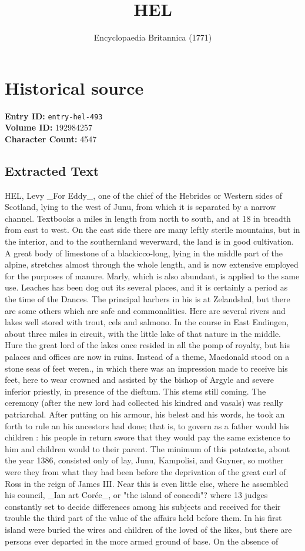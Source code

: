\documentclass{article}
\title{HEL}
\date{Encyclopaedia Britannica (1771)}
\begin{document}
\maketitle

\section*{Historical source}
\textbf{Entry ID:} \texttt{entry-hel-493} \\
\textbf{Volume ID:} 192984257 \\
\textbf{Character Count:} 4547

\subsection*{Extracted Text}
HEL, Levy \_For Eddy\_, one of the chief of the Hebrides or Western sides of Scotland, lying to the west of Junu, from which it is separated by a narrow channel. Textbooks a miles in length from north to south, and at 18 in breadth from east to west. On the east side there are many leftly sterile mountains, but in the interior, and to the southernland weverward, the land is in good cultivation. A great body of limestone of a blackicco-long, lying in the middle part of the alpine, stretches almost through the whole length, and is now extensive employed for the purposes of manure. Marly, which is also abundant, is applied to the same use. Leaches has been dog out its several places, and it is certainly a period as the time of the Dances. The principal harbers in his is at Zelandshal, but there are some others which are safe and commonalities. Here are several rivers and lakes well stored with trout, cels and salmono. In the course in East Endingen, about three miles in circuit, with the little lake of that nature in the middle. Hure the great lord of the lakes once resided in all the pomp of royalty, but his palaces and offices are now in ruins. Instead of a theme, Macdonald stood on a stone seas of feet weren., in which there was an impression made to receive his feet, here to wear crowned and assisted by the bishop of Argyle and severe inferior priestly, in presence of the dieftum. This stems still coming. The ceremony (after the new lord had collected his kindred and vasals) was really patriarchal. After putting on his armour, his belest and his words, he took an forth to rule an his ancestors had done; that is, to govern as a father would his children : his people in return swore that they would pay the same existence to him and children would to their parent. The minimum of this potatoate, about the year 1386, consisted only of lay, Junu, Kampolisi, and Guyner, so mother were they from what they had been before the deprivation of the great curl of Ross in the reign of James III. Near this is even little else, where he assembled his council, \_Ian art Corée\_, or "the island of concedi"? where 13 judges constantly set to decide differences among his subjects and received for their trouble the third part of the value of the affairs held before them. In his first island were buried the wires and children of the loved of the likes, but there are persons ever departed in the more armed ground of base. On the absence of 
\end{document}
